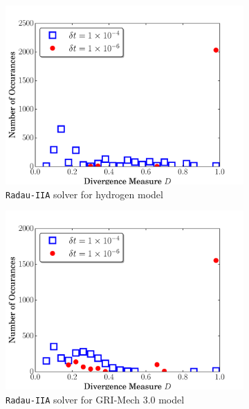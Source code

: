 \documentclass[preprint,review,11pt]{elsarticle}
\begin{document}
\begin{figure}[htbp]
  \centering
  \begin{subfigure}{0.49\textwidth}
      \includegraphics[width=\linewidth]{H2_radau2a_div.pdf}
      \caption{\texttt{Radau-IIA} solver for hydrogen model}
      \label{F:Rad_div_h2}
  \end{subfigure}
  \begin{subfigure}{0.49\textwidth}
      \includegraphics[width=\linewidth]{CH4_radau2a_div.pdf}
      \caption{\texttt{Radau-IIA} solver for GRI-Mech 3.0 model}
      \label{F:Rad_div_gri}
  \end{subfigure}
  \\
  \begin{subfigure}{0.49\textwidth}

\end{subfigure}
\end{figure}
\end{document}
